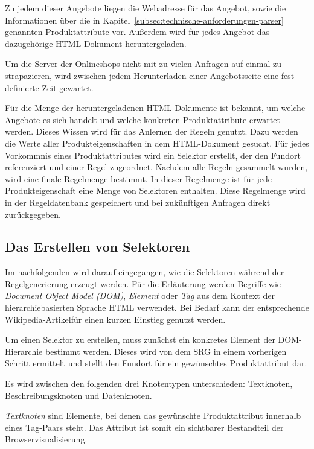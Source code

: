 Zu jedem dieser Angebote liegen die Webadresse für das Angebot, sowie die  Informationen über die in
Kapitel~\ref{subsec:technische-anforderungen-parser} genannten Produktattribute vor.
Außerdem wird für jedes Angebot das dazugehörige HTML-Dokument heruntergeladen.

Um die Server der Onlineshops nicht mit zu vielen Anfragen auf einmal zu strapazieren, wird zwischen jedem
Herunterladen einer Angebotsseite eine fest definierte Zeit gewartet.

Für die Menge der heruntergeladenen HTML-Dokumente ist bekannt, um welche Angebote es sich handelt und welche
konkreten Produktattribute erwartet werden.
Dieses Wissen wird für das Anlernen der Regeln genutzt.
Dazu werden die Werte aller Produkteigenschaften in dem HTML-Dokument gesucht.
Für jedes Vorkommnis eines Produktattributes wird ein Selektor erstellt, der den Fundort referenziert und einer Regel
zugeordnet.
Nachdem alle Regeln gesammelt wurden, wird eine finale Regelmenge bestimmt.
In dieser Regelmenge ist für jede Produkteigenschaft eine Menge von Selektoren enthalten.
Diese Regelmenge wird in der Regeldatenbank gespeichert und bei zukünftigen Anfragen direkt zurückgegeben.

\subsection{Das Erstellen von Selektoren}
\label{subsec:erstellen-von-selektoren}

Im nachfolgenden wird darauf eingegangen, wie die Selektoren während der Regelgenerierung erzeugt werden.
Für die Erläuterung werden Begriffe wie \textit{Document Object Model (DOM)}, \textit{Element} oder \textit{Tag} aus
dem Kontext der hierarchiebasierten Sprache HTML verwendet.
Bei Bedarf kann der entsprechende Wikipedia-Artikel\footnotemark für einen kurzen Einstieg genutzt werden.

Um einen Selektor zu erstellen, muss zunächst ein konkretes Element der DOM-Hierarchie bestimmt werden.
Dieses wird von dem SRG in einem vorherigen Schritt ermittelt und stellt den Fundort für ein gewünschtes
Produktattribut dar.

Es wird zwischen den folgenden drei Knotentypen unterschieden: Textknoten, Beschreibungsknoten und Datenknoten.

\textit{Textknoten} sind Elemente, bei denen das gewünschte Produktattribut innerhalb eines Tag-Paars steht.
Das Attribut ist somit ein sichtbarer Bestandteil der Browservisualisierung.

